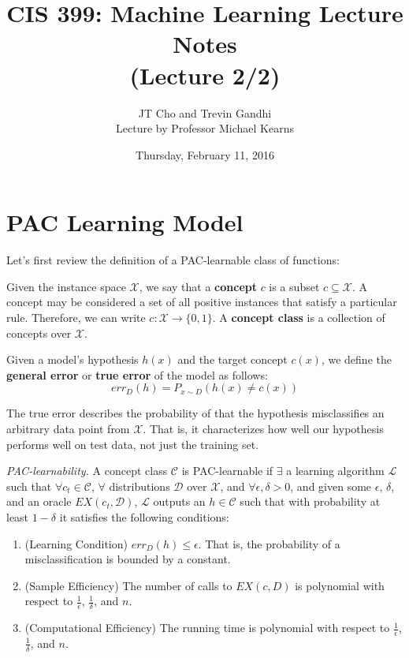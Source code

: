 \documentclass{article}
\title{CIS 399: Machine Learning Lecture Notes \\ (Lecture 2/2)}
\author{JT Cho and Trevin Gandhi \\
Lecture by Professor Michael Kearns}
\date{Thursday, February 11, 2016}
\newcommand{\ee}{\ensuremath{\epsilon}}
\begin{document}
\maketitle

\tableofcontents
\clearpage

\section{PAC Learning Model}
Let's first review the definition of a PAC-learnable class of functions:

Given the instance space $\mathcal{X}$, we say that a \textbf{concept}
$c$ is a subset $c \subseteq \mathcal{X}$. A concept may be considered a
set of all positive instances that satisfy a particular rule. Therefore,
we can write $c : \mathcal{X} \rightarrow \{0, 1\}$. A
\textbf{concept class} is a collection of concepts over $\mathcal{X}$.

Given a model's hypothesis $h(x)$ and the target concept $c(x)$, we
define the \textbf{general error} or \textbf{true error} of the model as
follows:
$$err_D(h) = P_{x\sim D}(h(x) \neq c(x))$$

The true error describes the probability of that the hypothesis
misclassifies an arbitrary data point from $\mathcal{X}$. That is, it
characterizes how well our hypothesis performs well on test data, not
just the training set.

\emph{PAC-learnability.} A concept class $\mathcal{C}$ is PAC-learnable
if $\exists$ a learning algorithm
$\mathcal{L}$ such that $\forall c_t \in \mathcal{C}$, $\forall$
distributions $\mathcal{D}$ over $\mathcal{X}$, and
$\forall \ee, \delta > 0$, and given some $\ee$, $\delta$, and
an oracle $EX(c_t, \mathcal{D})$, $\mathcal{L}$ outputs an
$h \in \mathcal{C}$ such that with probability at least $1-\delta$ it
satisfies the following conditions:
\begin{enumerate}
    \item (Learning Condition) $err_D(h) \leq
        \ee$. That is, the probability of a misclassification is
        bounded by a constant.
    \item (Sample Efficiency) The number of calls to $EX(c, D)$ is
        polynomial with respect to $\frac{1}{\ee}$,
        $\frac{1}{\delta}$, and $n$.
    \item (Computational Efficiency) The running time is
        polynomial with respect to $\frac{1}{\ee}$,
        $\frac{1}{\delta}$, and $n$.
\end{enumerate}
\end{document}
